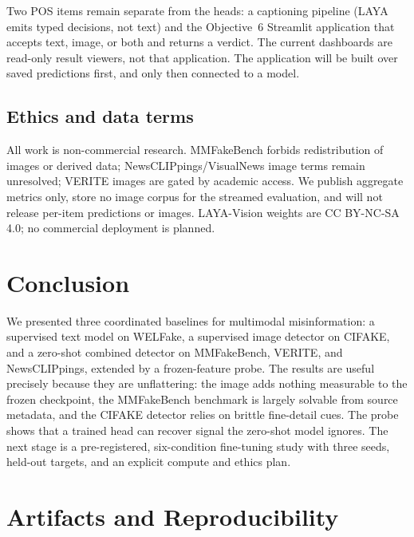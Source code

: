 \documentclass[11pt]{article}
\begin{document}
Two POS items remain separate from the heads: a captioning pipeline (LAYA emits typed decisions, not text) and the Objective~6 Streamlit application that accepts text, image, or both and returns a verdict. The current dashboards are read-only result viewers, not that application. The application will be built over saved predictions first, and only then connected to a model.

\subsection{Ethics and data terms}

All work is non-commercial research. MMFakeBench forbids redistribution of images or derived data; NewsCLIPpings/VisualNews image terms remain unresolved; VERITE images are gated by academic access. We publish aggregate metrics only, store no image corpus for the streamed evaluation, and will not release per-item predictions or images. LAYA-Vision weights are CC BY-NC-SA 4.0; no commercial deployment is planned.

\section{Conclusion}

We presented three coordinated baselines for multimodal misinformation: a supervised text model on WELFake, a supervised image detector on CIFAKE, and a zero-shot combined detector on MMFakeBench, VERITE, and NewsCLIPpings, extended by a frozen-feature probe. The results are useful precisely because they are unflattering: the image adds nothing measurable to the frozen checkpoint, the MMFakeBench benchmark is largely solvable from source metadata, and the CIFAKE detector relies on brittle fine-detail cues. The probe shows that a trained head can recover signal the zero-shot model ignores. The next stage is a pre-registered, six-condition fine-tuning study with three seeds, held-out targets, and an explicit compute and ethics plan.

\appendix
\section{Artifacts and Reproducibility}
\end{document}
